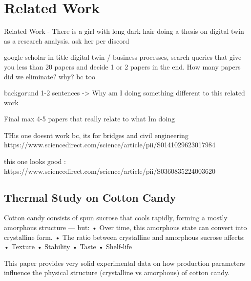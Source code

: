 \chapter{Related Work}
\label{sec:rel}

Related Work - There is a girl with long dark hair doing a thesis on digital twin as a research analysis. ask her per discord

google scholar in-title digital twin / business processes, search queries that give you less than 20 papers and decide 1 or 2 papers in the end. How many papers did we eliminate? why? bc too

backgorund 1-2 sentences
-> Why am I doing something different to this related work

Final max 4-5 papers that really relate to what Im doing


THis one doesnt work bc, its for bridges and civil engineering
https://www.sciencedirect.com/science/article/pii/S0141029623017984

this one looks good :
https://www.sciencedirect.com/science/article/pii/S0360835224003620

\section{Thermal Study on Cotton Candy}
Cotton candy consists of spun sucrose that cools rapidly, forming a mostly amorphous structure — but:
	•	Over time, this amorphous state can convert into crystalline form.
	•	The ratio between crystalline and amorphous sucrose affects:
	•	Texture
	•	Stability
	•	Taste
	•	Shelf-life



This paper provides very solid experimental data on how production parameters influence the physical structure (crystalline vs amorphous) of cotton candy.

